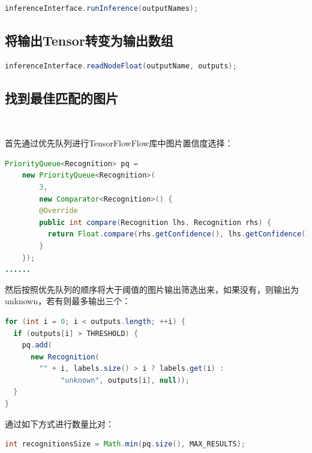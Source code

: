 \documentclass[UTF8, Microsoft YaHei]{book}
\begin{document}
\begin{small}
\begin{lstlisting}[language=java]
inferenceInterface.runInference(outputNames);
\end{lstlisting}
\end{small}

	\subsection{将输出Tensor转变为输出数组}

\begin{small}
\begin{lstlisting}[language=java]
inferenceInterface.readNodeFloat(outputName, outputs);
\end{lstlisting}
\end{small}

	\subsection{找到最佳匹配的图片}

~

首先通过优先队列进行TensorFlowFlow库中图片置信度选择：

\begin{small}
\begin{lstlisting}[language=java]
PriorityQueue<Recognition> pq =
    new PriorityQueue<Recognition>(
        3,
        new Comparator<Recognition>() {
        @Override
        public int compare(Recognition lhs, Recognition rhs) {
          return Float.compare(rhs.getConfidence(), lhs.getConfidence());
        }
    });
......
\end{lstlisting}
\end{small}


然后按照优先队列的顺序将大于阈值的图片输出筛选出来，如果没有，则输出为unknown，若有则最多输出三个：

\begin{small}
\begin{lstlisting}[language=java]
for (int i = 0; i < outputs.length; ++i) {
  if (outputs[i] > THRESHOLD) {
    pq.add(
      new Recognition(
        "" + i, labels.size() > i ? labels.get(i) :
        	 "unknown", outputs[i], null));
  }
}
\end{lstlisting}
\end{small}

通过如下方式进行数量比对：
\begin{small}
\begin{lstlisting}[language=java]
int recognitionsSize = Math.min(pq.size(), MAX_RESULTS);
\end{lstlisting}
\end{small}
\end{document}
